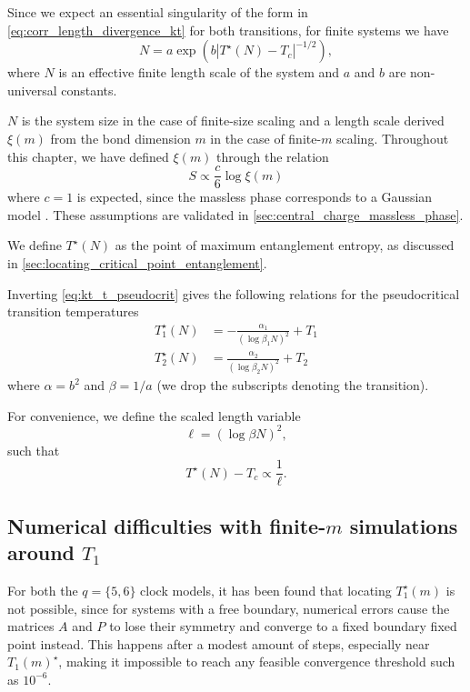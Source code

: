Since we expect an essential singularity of the form in \autoref{eq:corr_length_divergence_kt} for both transitions,
for finite systems we have
\begin{equation}\label{eq:kt_t_pseudocrit}
  N = a \exp \left( b |T^{\star}(N) - T_c|^{-1/2}  \right),
\end{equation}
where $N$ is an effective finite length scale of the system and $a$ and $b$ are non-universal constants.

$N$ is the system size in the case of finite-size scaling and a length scale derived $\xi(m)$ from the bond dimension
$m$ in the case of finite-$m$ scaling.
Throughout this chapter, we have defined $\xi(m)$ through the relation
\begin{equation}\label{eq:entropy_as_function_of_xi2}
  S \propto \frac{c}{6} \log \xi(m)
\end{equation}
where $c = 1$ is expected, since the massless phase corresponds to a Gaussian model \cite{kosterlitz1974critical}.
These assumptions are validated in \autoref{sec:central_charge_massless_phase}.

We define $T^{\star}(N)$ as the point of maximum entanglement entropy, as discussed in
\autoref{sec:locating_critical_point_entanglement}.

Inverting \autoref{eq:kt_t_pseudocrit} gives the following relations for the pseudocritical transition temperatures
\begin{align}
  T^{\star}_{1}(N) &= -\frac{\alpha_1}{(\log \beta_1 N)^2} + T_1 \\
  T^{\star}_{2}(N) &= \frac{\alpha_2}{(\log \beta_2 N)^2} + T_2
\end{align}
where $\alpha = b^2$ and $\beta = 1/a$ (we drop the subscripts denoting the transition).

For convenience, we define the scaled length variable
\begin{equation}\label{eq:scaled_length_scale_kt}
  \ell = (\log \beta N)^2,
\end{equation}
such that
\begin{equation}
  T^{\star}(N) - T_c \propto \frac{1}{\ell}.
\end{equation}

\subsection{Numerical difficulties with finite-$m$ simulations around $T_1$}\label{sec:numerical_difficulties_t1}

For both the $q = \{5, 6\}$ clock models, it has been found that locating $T_1^{\star}(m)$ is not possible,
since for systems with a free boundary, numerical errors cause the matrices $A$ and $P$ to lose their symmetry and
converge to a fixed boundary fixed point instead.
This happens after a modest amount of steps, especially near $T_1(m)^{\star}$,
making it impossible to reach any feasible convergence threshold such as $10^{-6}$.

